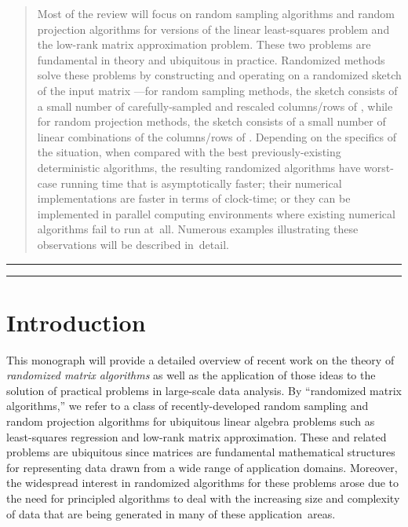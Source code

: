 \documentclass[twoside]{article}
\begin{document}
\begin{abstract}
Most of the review will focus on random sampling algorithms and random 
projection algorithms for versions of the linear least-squares problem and 
the low-rank matrix approximation problem.
These two problems are fundamental in theory and ubiquitous in practice.
Randomized methods solve these problems by constructing and operating on a 
randomized sketch of the input matrix ---for random sampling methods, the 
sketch consists of a small number of carefully-sampled and rescaled 
columns/rows of , while for random projection methods, the sketch 
consists of a small number of linear combinations of the columns/rows of .
Depending on the specifics of the situation, when compared with the best
previously-existing deterministic algorithms, the resulting randomized 
algorithms have worst-case running time that is asymptotically faster; their
numerical implementations are faster in terms of clock-time; or they can be 
implemented in parallel computing environments where existing numerical 
algorithms fail to run at~all.
Numerous examples illustrating these observations will be described in~detail.
\end{abstract}


\newpage
\rule{6in}{0.1mm}
\tableofcontents
\rule{6in}{0.1mm}
\newpage

\newpage

\section{Introduction}

This monograph will provide a detailed overview of recent work on the theory 
of \emph{randomized matrix algorithms} as well as the application of those 
ideas to the solution of practical problems in large-scale data analysis.
By ``randomized matrix algorithms,'' we refer to a class of 
recently-developed random sampling and random projection algorithms for 
ubiquitous linear algebra problems such as least-squares regression and 
low-rank matrix approximation.
These and related problems are ubiquitous since matrices are fundamental 
mathematical structures for representing data drawn from a wide range of 
application domains.
Moreover, the widespread interest in randomized algorithms for these 
problems arose due to the need for principled algorithms to deal with the 
increasing size and complexity of data that are being generated in many of 
these application~areas.
\end{document}

